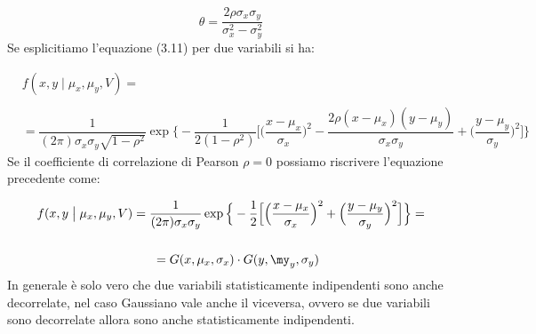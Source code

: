 \documentclass[11pt,a4paper]{book}
\begin{document}
\begin{equation}
	\theta = \dfrac{2\rho \sigma_x \sigma_y}{\sigma_x^2 - \sigma_y^2}
\end{equation}
\newline
Se esplicitiamo l'equazione (3.11) per due variabili si ha: 

\begin{align*}
	& f(x,y \; \big \vert \; \mu_x,\mu_y,V) = 
	\\
	\\
	&= \dfrac{1}{(2\pi)\sigma_x \sigma_y \sqrt{1-\rho^2}}  \exp{\Big \{ -\dfrac{1}{2(1-\rho^2)} \Big[ \Big ( \dfrac{x-\mu_x}{\sigma_x} \Big)^2 - \dfrac{2\rho(x-\mu_x)(y-\mu_y)}{\sigma_x \sigma_y} + \Big (\dfrac{y-\mu_y}{\sigma_y} \Big)^2  \Big]  \Big \}}	
\end{align*}
\newline
Se il coefficiente di correlazione di Pearson $\rho = 0$ possiamo riscrivere l'equazione precedente come:

\begin{align*}
	& f(x,y \; \big \vert \; \mu_x,\mu_y,V) = \dfrac{1}{(2\pi)\sigma_x \sigma_y} \exp{\Big \{ - \dfrac{1}{2} \Big[\Big ( \dfrac{x-\mu_x}{\sigma_x} \Big)^2 + \Big (\dfrac{y-\mu_y}{\sigma_y} \Big)^2 \Big] \Big \}} = 
	\\
	\\
	&\phantom{b= --------}= G(x,\mu_x,\sigma_x) \cdot G(y,\my_y,\sigma_y)
\end{align*}
\newline
In generale \`{e} solo vero che due variabili statisticamente indipendenti sono anche decorrelate, nel caso Gaussiano vale anche il viceversa, ovvero se due variabili sono decorrelate allora sono anche statisticamente indipendenti.
\end{document}
